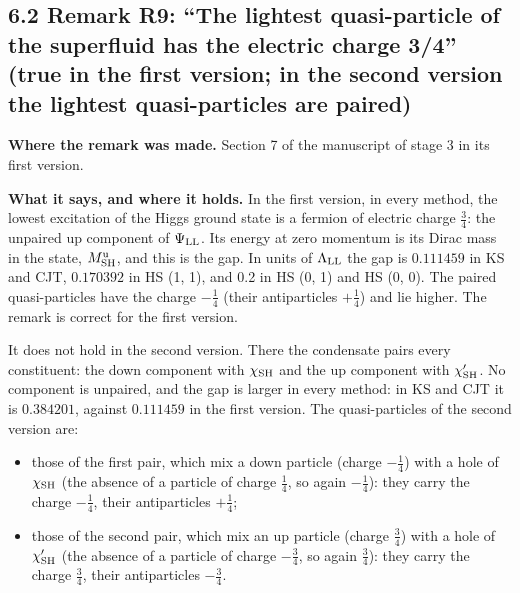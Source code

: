 \documentclass[
  10pt,
]{article}
\providecommand{\tightlist}{%
  \setlength{\itemsep}{0pt}\setlength{\parskip}{0pt}}
\begin{document}
\hypertarget{remark-r9-the-lightest-quasi-particle-of-the-superfluid-has-the-electric-charge-34-true-in-the-first-version-in-the-second-version-the-lightest-quasi-particles-are-paired}{%
\subsection{6.2 Remark R9: ``The lightest quasi-particle of the
superfluid has the electric charge 3/4'' (true in the first version; in
the second version the lightest quasi-particles are
paired)}\label{remark-r9-the-lightest-quasi-particle-of-the-superfluid-has-the-electric-charge-34-true-in-the-first-version-in-the-second-version-the-lightest-quasi-particles-are-paired}}

\textbf{Where the remark was made.} Section 7 of the manuscript of stage
3 in its first version.

\textbf{What it says, and where it holds.} In the first version, in
every method, the lowest excitation of the Higgs ground state is a
fermion of electric charge \(\tfrac34\): the unpaired up component of
\(\Psi_{\rm LL}\). Its energy at zero momentum is its Dirac mass in the
state, \(M^{\rm u}_{\rm SH}\), and this is the gap. In units of
\(\Lambda_{\rm LL}\) the gap is \(0.111459\) in KS and CJT, \(0.170392\)
in HS (1, 1), and 0.2 in HS (0, 1) and HS (0, 0). The paired
quasi-particles have the charge \(-\tfrac14\) (their antiparticles
\(+\tfrac14\)) and lie higher. The remark is correct for the first
version.

It does not hold in the second version. There the condensate pairs every
constituent: the down component with \(\chi_{\rm SH}\) and the up
component with \(\chi'_{\rm SH}\). No component is unpaired, and the gap
is larger in every method: in KS and CJT it is \(0.384201\), against
\(0.111459\) in the first version. The quasi-particles of the second
version are:

\begin{itemize}
\tightlist
\item
  those of the first pair, which mix a down particle (charge
  \(-\tfrac14\)) with a hole of \(\chi_{\rm SH}\) (the absence of a
  particle of charge \(\tfrac14\), so again \(-\tfrac14\)): they carry
  the charge \(-\tfrac14\), their antiparticles \(+\tfrac14\);
\item
  those of the second pair, which mix an up particle (charge
  \(\tfrac34\)) with a hole of \(\chi'_{\rm SH}\) (the absence of a
  particle of charge \(-\tfrac34\), so again \(\tfrac34\)): they carry
  the charge \(\tfrac34\), their antiparticles \(-\tfrac34\).
\end{itemize}
\end{document}
